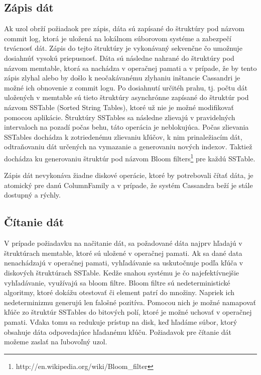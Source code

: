 \documentclass[11pt,twoside,a4paper]{book}
\begin{document}
\subsection{Zápis dát}
Ak uzol obrží požiadaok pre zápis, dáta sú zapísané do štruktúry pod názvom commit log, ktorá je uložená na lokálnom súborovom systéme a zabezpečí trvácnosť dát. Zápis do tejto štruktúry je vykonávaný sekvenčne čo umožnuje dosiahnúť vysokú priepusnosť. Dáta sú následne nahrané do štruktúry pod názvom memtable, ktorá sa nachádza v operačnej pamati a v prípade, že by tento zápis zlyhal alebo by došlo k neočakávanému zlyhaniu inštancie Cassandri je možné ich obnovenie z commit logu. Po dosiahnutí určitéh prahu, tj. počtu dát uložených v memtable sú tieto štruktúry asynchrónne zapísané do štruktúr pod názvom SSTable (Sorted String Tables), ktoré už nie je možné modifikovať pomocou aplikácie. Štruktúry SSTables sa následne zlievajú v pravidelných intervaloch na pozadí počas behu, táto operácia je neblokujúca. Počas zlievania SSTables dochádza k zotriedenému zlievaniu kľúčov, k nim prinaležiacím dát, odtraňovaniu dát určených na vymazanie a generovaniu nových indexov. Taktiež dochádza ku generovaniu štruktúr pod názvom Bloom filters\footnote{http://en.wikipedia.org/wiki/Bloom\_filter} pre každú SSTable.

Zápis dát nevykonáva žiadne diskové operácie, ktoré by potrebovali čítať dáta, je atomický pre danú ColumnFamily a v prípade, že systém Cassandra beží je stále dostupný a rýchly.


\subsection{Čítanie dát}
V prípade požiadavku na načitanie dát, sa požadované dáta najprv hľadajú v štruktúrach memtable, ktoré sú uložené v operačnej pamati. Ak sa dané data nenachádzajú v operačnej pamati, vyhľadávanie sa uskutočnuje podľa kľúča v diskových štruktúrach SSTable. Kedže snahou systému je čo najefektívnejšie vyhľadávanie, využívajú sa bloom filtre. Bloom filtre sú nedeterministické algoritmy, ktoré dokážu otestovať či element patrí do množiny. Napriek ich nedeterminizmu generujú len falošné pozitíva. Pomocou nich je možné namapovať kľúče zo štruktúr SSTables do bitových polí, ktoré je možné uchovať v operačnej pamati. Vďaka tomu sa redukuje prístup na disk, keď hľadáme súbor, ktorý obsahuje dáta odpovedajúce hľadanému kľúču. Požiadavok pre čítanie dát možeme zaslať na ľubovoľný uzol.
\end{document}
